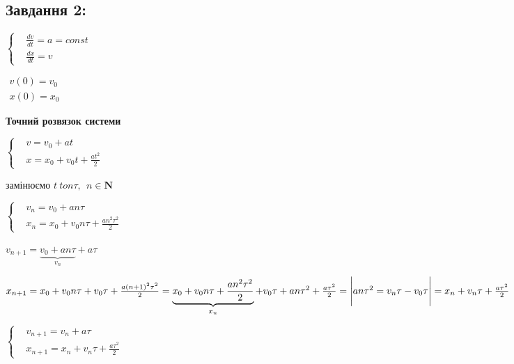 \subsection{Завдання 2:}

$\left\{\begin{aligned}
    &\frac{dv}{dt} = a = const\\
    &\frac{dx}{dt} = v
\end{aligned}\right.$

$\begin{aligned}
    v(0) = v_0\\
    x(0) = x_0
\end{aligned}$

\textbf{Точний розвязок системи}

$\left\{\begin{aligned}
    &v = v_0 + at\\
    &x = x_0 + v_0t + \frac{at^2}{2}
\end{aligned}\right.$

замінюємо $t \ to n\tau, \ \ n \in \mathbf{N}$

$\left\{\begin{aligned}
    &v_n = v_0 + an\tau\\
    &x_n = x_0 + v_0n\tau + \frac{an^2\tau^2}{2}
\end{aligned}\right.$

$v_{n+1} = \underbrace{v_0 + an\tau}_{v_n} + a\tau$

$x_{n+1} = x_0 + v_0n\tau + v_0\tau + \frac{a(n+1)^2\tau^2}{2} = 
\underbrace{x_0 + v_0n\tau + \frac{an^2\tau^2}{2}}_{x_n} + v_0\tau + an\tau^2 + \frac{a\tau^2}{2} = \\
\Bigg | an\tau^2 = v_n\tau - v_0\tau \Bigg | = x_n + v_n\tau + \frac{a\tau^2}{2}$

$\left\{\begin{aligned}
    &v_{n+1} = v_n + a\tau\\
    &x_{n+1} = x_n + v_n\tau + \frac{a\tau^2}{2}
\end{aligned}\right.$